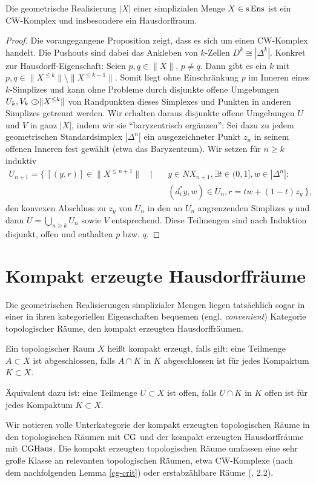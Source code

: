 \begin{kor} \label{real-hd}
  Die geometrische Realisierung $|X|$ einer simplizialen Menge $X \in
  \operatorname{s}\operatorname{Ens}$ ist ein CW-Komplex und insbesondere ein Hausdorffraum.
\end{kor}
\begin{proof}
  Die vorangegangene Proposition zeigt, dass es sich um einen
  CW-Komplex handelt. Die Pushouts sind dabei das Ankleben von
  $k$-Zellen $D^k \cong |\Delta^k|$. Konkret zur
  Hausdorff-Eigenschaft: Seien $p, q \in \|X\|$, $p \neq q$. Dann gibt
  es ein $k$ mit $p, q \in \|X^{\leq k}\| \setminus \|X^{\leq
    k-1}\|$. Somit liegt ohne Einschränkung $p$ im Inneren eines
  $k$-Simplizes und kann ohne Probleme durch disjunkte offene
  Umgebungen $U_k, V_k \subset\kern-0.58em\circ \|X^{\leq k}\|$ von Randpunkten dieses
  Simplexes und Punkten in anderen Simplizes getrennt werden. Wir
  erhalten daraus disjunkte offene Umgebungen $U$ und $V$ in ganz
  $|X|$, indem wir sie ``baryzentrisch ergänzen'': Sei dazu zu jedem
  geometrischen Standardsimplex $|\Delta^n|$ ein ausgezeichneter Punkt
  $z_n$ in seinem offenen Inneren fest gewählt (etwa das
  Baryzentrum). Wir setzen für $n \geq k$ induktiv
  \begin{align*}
    U_{n+1} = \big\{ \: [(y, r)] \in \|X^{\leq n+1}\| \quad \big| \quad
    & y \in NX_{n+1}, \exists t \in (0, 1], w \in |\Delta^n|: \\
    & (d_i^* y, w) \in U_n, r = t w + (1-t) z_y \: \big\},
  \end{align*}
  den konvexen Abschluss zu $z_y$ von $U_n$ in den an $U_n$
  angrenzenden Simplizes $y$ und dann $U = \bigcup_{n \geq k} U_n$
  sowie $V$ entsprechend. Diese Teilmengen sind nach Induktion
  disjunkt, offen und enthalten $p$ bzw. $q$.
\end{proof}

\section{Kompakt erzeugte Hausdorffräume}

Die geometrischen Realisierungen simplizialer Mengen liegen
tatsächlich sogar in einer in ihren kategoriellen Eigenschaften
bequemen (engl. \emph{convenient}) Kategorie topologischer Räume, den
kompakt erzeugten Hausdorffräumen.

\begin{defn} \label{def:cg}
  Ein topologischer Raum $X$ heißt kompakt erzeugt, falls gilt: eine
  Teilmenge $A \subset X$ ist abgeschlossen, falls $A \cap K$ in $K$
  abgeschlossen ist für jedes Kompaktum $K \subset X$.
\end{defn}
\begin{bem}
  Äquivalent dazu ist: eine Teilmenge $U \subset X$ ist offen, falls
  $U \cap K$ in $K$ offen ist für jedes Kompaktum $K \subset X$.
\end{bem}
Wir notieren volle Unterkategorie der kompakt erzeugten topologischen
Räume in den topologischen Räumen mit $\operatorname{CG}$ und der kompakt erzeugten
Hausdorffräume mit $\operatorname{CGHaus}$. Die kompakt erzeugten topologischen
Räume umfassen eine sehr große Klasse an relevanten topologischen
Räumen, etwa CW-Komplexe (nach dem nachfolgenden Lemma \ref{cg-crit})
oder erstabzählbare Räume (\cite{Steenrod}, 2.2).


